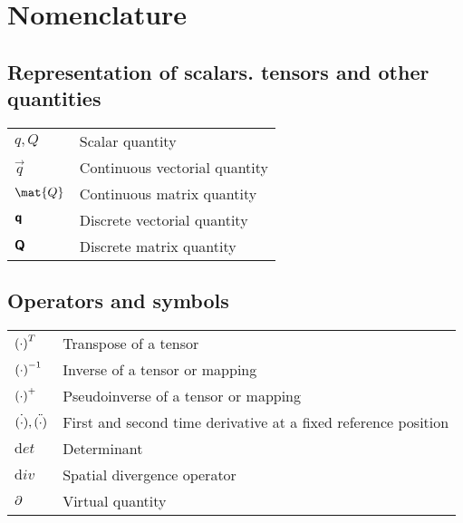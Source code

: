 \section*{Nomenclature}\label{sec:nomenclature}
\subsection*{Representation of scalars. tensors and other quantities}
\begin{tabular}{l l}
$q,Q$      &Scalar quantity  \\
$\vec{q}$  &Continuous vectorial quantity  \\
$\mat{Q}$  &Continuous matrix quantity \\
$\boldsymbol{ \mathsf{q} }$ &Discrete vectorial quantity  \\
$\boldsymbol{\mathsf{Q}}$ &Discrete matrix quantity \\
\end{tabular}


\subsection*{Operators and symbols}
\begin{tabular}{l l}
${(\cdot)}^{T}$   &Transpose of a tensor  \\
${(\cdot)}^{-1}$  &Inverse of a tensor or mapping  \\
${(\cdot)}^{+}$ &Pseudoinverse of a tensor or mapping  \\
$\dot{(\cdot)},\ddot{(\cdot)}$ &First and second time derivative at a fixed reference position  \\
$\mathrm det$ &Determinant  \\
$\mathrm div$ &Spatial divergence operator  \\
$\partial$ &Virtual quantity  \\
\end{tabular}


